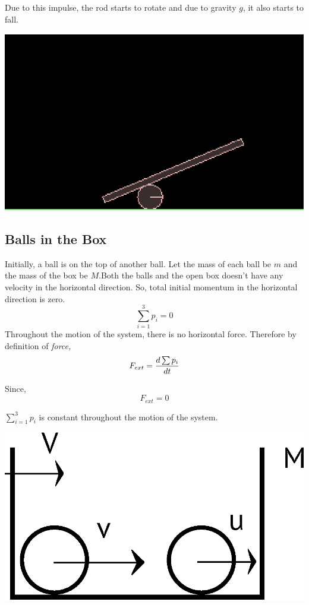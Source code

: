 \documentclass[11pt]{article}%
\begin{document}
Due to this impulse, the rod starts to rotate and due to gravity $g$, it also starts to fall.
\vskip 0.5in
\centerline{\includegraphics[scale=0.7]{toppledexec}}
\vskip 0.3in
\subsection{Balls in the Box}
Initially, a ball is on the top of another ball. Let the mass of each ball be $m$ and the mass of the box be $M$.Both the balls and the open box doesn't have any velocity in the horizontal direction. So, total initial momentum in the horizontal direction is zero.\begin{equation}\sum_{i=1}^3p_i=0\end{equation} 
Throughout the motion of the system, there is no horizontal force. Therefore by definition of \it force\rm\cite{hcverma},\begin{equation}F_{ext}= {d\sum p_i\over\displaystyle dt}\end{equation}

Since, \begin{equation}F_{ext}=0\end{equation}
\centerline{$\displaystyle \sum_{i=1}^3p_i$ is constant throughout the motion of the system.}

\vskip 0.2in
\centerline{\includegraphics[scale=0.4]{dubdubdub}}
\end{document}

